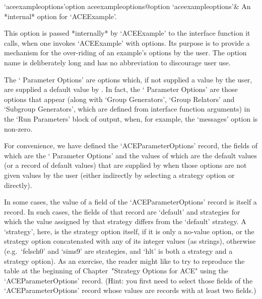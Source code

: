 \>`aceexampleoptions'{option aceexampleoptions}@{option `aceexampleoptions'}&
An *internal* option for `ACEExample'.

This option is passed  *internally*  by  `ACEExample'  to  the  {\ACE}
interface function  it  calls,  when  one  invokes  `ACEExample'  with
options. Its purpose is to provide a mechanism for the over-riding  of
an example's options by the user. The option name is deliberately long
and has no abbreviation to discourage user use.

\enditems


The \lq{}{\ACE} Parameter Options' are options which, if not  supplied
a value by the user, are supplied a default value by {\ACE}. In  fact,
the \lq{}{\ACE} Parameter  Options'  are  those  options  that  appear
(along  with  `Group  Generators',  `Group  Relators'  and   `Subgroup
Generators',  which  are  defined  from  {\ACE}   interface   function
arguments) in the \lq{}Run Parameters' block of {\ACE}  output,  when,
for example, the `messages' option is non-zero.

For convenience, we have defined the `ACEParameterOptions'{\undoquotes
{}}   record,   the
fields of which are the \lq{}{\ACE} Parameter Options' and the  values
of which are the default values (or a record of default  values)  that
are supplied by {\ACE} when those options are not given values by  the
user (either indirectly by selecting a strategy option or directly).

In some cases, the value  of  a  field  of  the  `ACEParameterOptions'
record is itself a record. In such cases, the fields  of  that  record
are `default' and strategies for which  the  value  assigned  by  that
strategy differs from the `default' strategy. A \lq{}strategy',  here,
is the strategy option itself, if it is only a no-value option, or the
strategy option concatenated  with  any  of  its  integer  values  (as
strings), otherwise (e.g.~`felsch0' and `sims9'  are  strategies,  and
`hlt' is both a strategy and a strategy option). As an  exercise,  the
reader might like to try to reproduce the table at  the  beginning  of
Chapter~"Strategy Options for  ACE"  using  the  `ACEParameterOptions'
record.  (Hint:  you  first  need  to  select  those  fields  of   the
`ACEParameterOptions' record whose values are records  with  at  least
two fields.)

